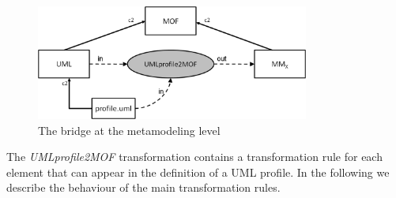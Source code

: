 \begin{figure}[htbp]
	\centering
		\includegraphics[width=0.80\textwidth]{figures/metamodelingLevel.png}
	\caption{The bridge at the metamodeling level}
	\label{fig:metamodelingLevel}
\end{figure}
%
The \textit{UMLprofile2MOF} transformation contains a transformation rule for each element that can appear in the definition of a UML profile.
In the following we describe the behaviour of the main transformation rules.

